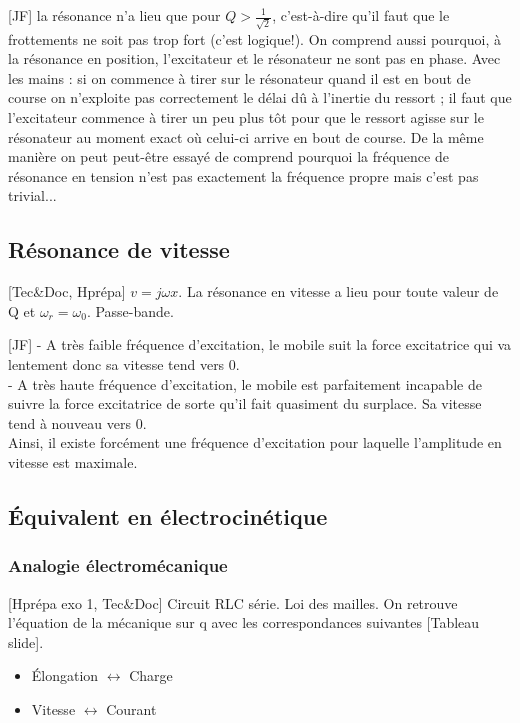 \documentclass[11pt]{report}
\numberwithin{figure}{section}
\numberwithin{equation}{section}
\numberwithin{table}{section}
\newcommand{\1}{\boldsymbol{1}}
\begin{document}
[JF] la résonance n’a lieu que pour $Q>\frac{1}{\sqrt{2}}$, c’est-à-dire qu’il faut que le frottements ne soit
pas trop fort (c’est logique!). On comprend aussi pourquoi, à la résonance en position, l’excitateur et le résonateur
ne sont pas en phase. Avec les mains : si on commence à tirer sur le résonateur quand il est en bout de course on
n’exploite pas correctement le délai dû à l’inertie du ressort ; il faut que l’excitateur commence à tirer un peu plus
tôt pour que le ressort agisse sur le résonateur au moment exact où celui-ci arrive en bout de course. De la même
manière on peut peut-être essayé de comprend pourquoi la fréquence de résonance en tension n’est pas exactement
la fréquence propre mais c’est pas trivial...

\subsection{Résonance de vitesse}

[Tec\&Doc, Hprépa] $v = j\omega x$. La résonance en vitesse a lieu pour toute valeur de Q et $\omega_r = \omega_0$. Passe-bande.


[JF] - A très faible fréquence d'excitation, le mobile suit la force excitatrice qui va lentement donc sa vitesse tend vers
0. \\
- A très haute fréquence d'excitation, le mobile est parfaitement incapable de suivre la force excitatrice de sorte
qu'il fait quasiment du surplace. Sa vitesse tend à nouveau vers 0. \\
Ainsi, il existe forcément une fréquence d'excitation pour laquelle l'amplitude en vitesse est maximale.



\subsection{Équivalent en électrocinétique}

\subsubsection{Analogie électromécanique}

[Hprépa exo 1, Tec\&Doc] Circuit RLC série. Loi des mailles. On retrouve l'équation de la mécanique sur q avec les correspondances suivantes [Tableau slide].

\begin{itemize}
\item Élongation $\longleftrightarrow$ Charge 
\item Vitesse $\longleftrightarrow$ Courant
\end{itemize}
\end{document}
